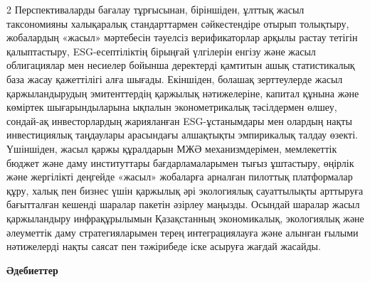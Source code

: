 \begin{multicols}{2}
Перспективаларды бағалау тұрғысынан, біріншіден, ұлттық жасыл
таксономияны халықаралық стандарттармен сәйкестендіре отырып толықтыру,
жобалардың «жасыл» мәртебесін тәуелсіз верификаторлар арқылы растау
тетігін қалыптастыру, ESG-есептіліктің бірыңғай үлгілерін енгізу және
жасыл облигациялар мен несиелер бойынша деректерді қамтитын ашық
статистикалық база жасау қажеттілігі алға шығады. Екіншіден, болашақ
зерттеулерде жасыл қаржыландырудың эмитенттердің қаржылық нәтижелеріне,
капитал құнына және көміртек шығарындыларына ықпалын эконометрикалық
тәсілдермен өлшеу, сондай-ақ инвесторлардың жарияланған ESG-ұстанымдары
мен олардың нақты инвестициялық таңдаулары арасындағы алшақтықты
эмпирикалық талдау өзекті. Үшіншіден, жасыл қаржы құралдарын МЖӘ
механизмдерімен, мемлекеттік бюджет және даму институттары
бағдарламаларымен тығыз ұштастыру, өңірлік және жергілікті деңгейде
«жасыл» жобаларға арналған пилоттық платформалар құру, халық пен бизнес
үшін қаржылық әрі экологиялық сауаттылықты арттыруға бағытталған кешенді
шаралар пакетін әзірлеу маңызды. Осындай шаралар жасыл қаржыландыру
инфрақұрылымын Қазақстанның экономикалық, экологиялық және әлеуметтік
даму стратегияларымен терең интеграциялауға және алынған ғылыми
нәтижелерді нақты саясат пен тәжірибеде іске асыруға жағдай жасайды.
\end{multicols}

\begin{center}
{\bfseries Әдебиеттер}
\end{center}

